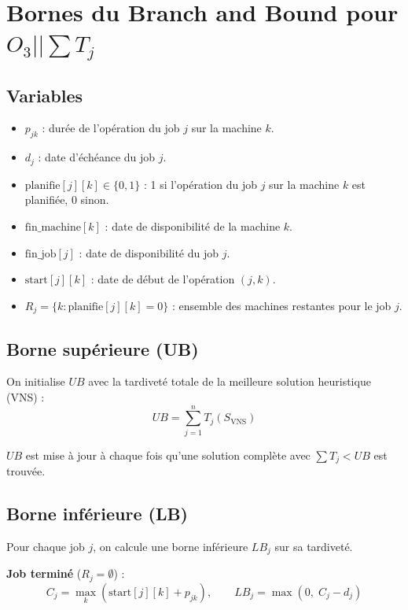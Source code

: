 \documentclass[a4paper,12pt]{article}
\begin{document}
\section*{Bornes du Branch and Bound pour $O_3||\sum T_j$}

\subsection*{Variables}

\begin{itemize}
    \item $p_{jk}$ : durée de l'opération du job $j$ sur la machine $k$.
    \item $d_j$ : date d'échéance du job $j$.
    \item $\text{planifie}[j][k] \in \{0, 1\}$ : 1 si l'opération du job $j$ sur la machine $k$ est planifiée, 0 sinon.
    \item $\text{fin\_machine}[k]$ : date de disponibilité de la machine $k$.
    \item $\text{fin\_job}[j]$ : date de disponibilité du job $j$.
    \item $\text{start}[j][k]$ : date de début de l'opération $(j, k)$.
    \item $R_j = \{k : \text{planifie}[j][k] = 0\}$ : ensemble des machines restantes pour le job $j$.
\end{itemize}

\subsection*{Borne supérieure (UB)}

On initialise $UB$ avec la tardiveté totale de la meilleure solution heuristique (VNS) :
\begin{equation}
    UB = \sum_{j=1}^{n} T_j(S_{\text{VNS}})
\end{equation}

$UB$ est mise à jour à chaque fois qu'une solution complète avec $\sum T_j < UB$ est trouvée.

\subsection*{Borne inférieure (LB)}

Pour chaque job $j$, on calcule une borne inférieure $LB_j$ sur sa tardiveté.

\textbf{Job terminé} ($R_j = \emptyset$) :
\begin{equation}
    C_j = \max_{k} \left( \text{start}[j][k] + p_{jk} \right), \qquad LB_j = \max(0,\; C_j - d_j)
\end{equation}
\end{document}
